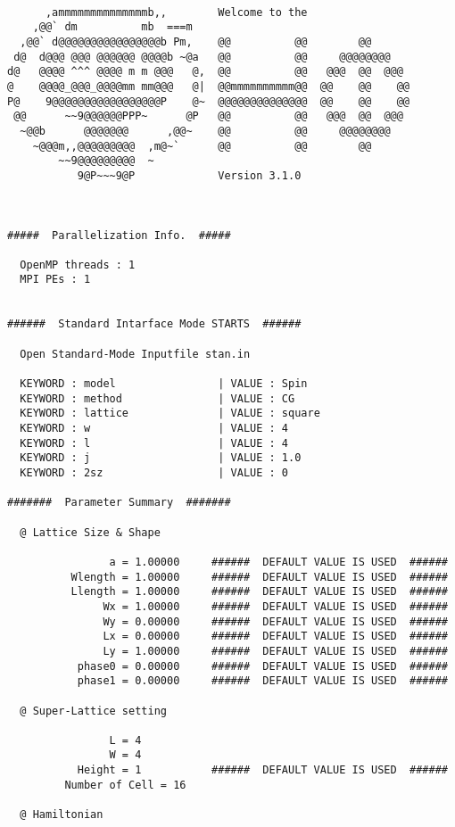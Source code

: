 \small
\begin{verbatim}

      ,ammmmmmmmmmmmmmb,,        Welcome to the
    ,@@` dm          mb  ===m
  ,@@` d@@@@@@@@@@@@@@@@b Pm,    @@          @@        @@
 d@  d@@@ @@@ @@@@@@ @@@@b ~@a   @@          @@     @@@@@@@@
d@   @@@@ ^^^ @@@@ m m @@@   @,  @@          @@   @@@  @@  @@@
@    @@@@_@@@_@@@@mm mm@@@   @|  @@mmmmmmmmmm@@  @@    @@    @@
P@    9@@@@@@@@@@@@@@@@@P    @~  @@@@@@@@@@@@@@  @@    @@    @@
 @@      ~~9@@@@@@PPP~      @P   @@          @@   @@@  @@  @@@
  ~@@b      @@@@@@@      ,@@~    @@          @@     @@@@@@@@
    ~@@@m,,@@@@@@@@@  ,m@~`      @@          @@        @@
        ~~9@@@@@@@@@  ~
           9@P~~~9@P             Version 3.1.0



#####  Parallelization Info.  #####

  OpenMP threads : 1
  MPI PEs : 1


######  Standard Intarface Mode STARTS  ######

  Open Standard-Mode Inputfile stan.in

  KEYWORD : model                | VALUE : Spin
  KEYWORD : method               | VALUE : CG
  KEYWORD : lattice              | VALUE : square
  KEYWORD : w                    | VALUE : 4
  KEYWORD : l                    | VALUE : 4
  KEYWORD : j                    | VALUE : 1.0
  KEYWORD : 2sz                  | VALUE : 0

#######  Parameter Summary  #######

  @ Lattice Size & Shape

                a = 1.00000     ######  DEFAULT VALUE IS USED  ######
          Wlength = 1.00000     ######  DEFAULT VALUE IS USED  ######
          Llength = 1.00000     ######  DEFAULT VALUE IS USED  ######
               Wx = 1.00000     ######  DEFAULT VALUE IS USED  ######
               Wy = 0.00000     ######  DEFAULT VALUE IS USED  ######
               Lx = 0.00000     ######  DEFAULT VALUE IS USED  ######
               Ly = 1.00000     ######  DEFAULT VALUE IS USED  ######
           phase0 = 0.00000     ######  DEFAULT VALUE IS USED  ######
           phase1 = 0.00000     ######  DEFAULT VALUE IS USED  ######

  @ Super-Lattice setting

                L = 4
                W = 4
           Height = 1           ######  DEFAULT VALUE IS USED  ######
         Number of Cell = 16

  @ Hamiltonian


\end{verbatim}
